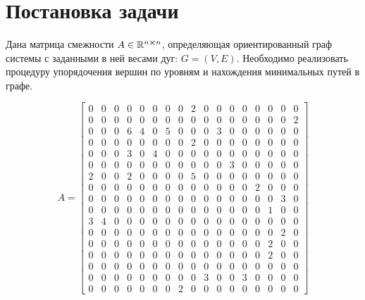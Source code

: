 


	
	
	\setcounter{page}{2}
	\tableofcontents
	\newpage
	

	\section{Постановка задачи}
	
	Дана матрица смежности $A\in\mathbb{R}^{n\cross n}$, определяющая ориентированный граф системы с заданными в ней весами дуг: $G = (V, E)$.	Необходимо реализовать процедуру упорядочения вершин по уровням и нахождения минимальных путей в графе.	
	
	
	\setcounter{MaxMatrixCols}{20}
	\begin{equation}
		A = 
		\begin{bmatrix}
			0 & 0 & 0 & 0 & 0 & 0 & 0 & 0 & 2 & 0 & 0 & 0 & 0 & 0 & 0 & 0 & 0 \\
			0 & 0 & 0 & 0 & 0 & 0 & 0 & 0 & 0 & 0 & 0 & 0 & 0 & 0 & 0 & 0 & 2 \\
			0 & 0 & 0 & 6 & 4 & 0 & 5 & 0 & 0 & 0 & 3 & 0 & 0 & 0 & 0 & 0 & 0 \\
			0 & 0 & 0 & 0 & 0 & 0 & 0 & 0 & 2 & 0 & 0 & 0 & 0 & 0 & 0 & 0 & 0 \\
			0 & 0 & 0 & 3 & 0 & 4 & 0 & 0 & 0 & 0 & 0 & 0 & 0 & 0 & 0 & 0 & 0 \\
			0 & 0 & 0 & 0 & 0 & 0 & 0 & 0 & 0 & 0 & 0 & 3 & 0 & 0 & 0 & 0 & 0 \\
			2 & 0 & 0 & 2 & 0 & 0 & 0 & 0 & 5 & 0 & 0 & 0 & 0 & 0 & 0 & 0 & 0 \\
			0 & 0 & 0 & 0 & 0 & 0 & 0 & 0 & 0 & 0 & 0 & 0 & 0 & 2 & 0 & 0 & 0 \\
			0 & 0 & 0 & 0 & 0 & 0 & 0 & 0 & 0 & 0 & 0 & 0 & 0 & 0 & 0 & 3 & 0 \\
			0 & 0 & 0 & 0 & 0 & 0 & 0 & 0 & 0 & 0 & 0 & 0 & 0 & 0 & 1 & 0 & 0 \\
			3 & 4 & 0 & 0 & 0 & 0 & 0 & 0 & 0 & 0 & 0 & 0 & 0 & 0 & 0 & 0 & 0 \\
			0 & 0 & 0 & 0 & 0 & 0 & 0 & 0 & 0 & 0 & 0 & 0 & 0 & 0 & 0 & 2 & 0 \\
			0 & 0 & 0 & 0 & 0 & 0 & 0 & 0 & 0 & 0 & 0 & 0 & 0 & 0 & 2 & 0 & 0 \\
			0 & 0 & 0 & 0 & 0 & 0 & 0 & 0 & 0 & 0 & 0 & 0 & 0 & 0 & 2 & 0 & 0 \\
			0 & 0 & 0 & 0 & 0 & 0 & 0 & 0 & 0 & 0 & 0 & 0 & 0 & 0 & 0 & 0 & 0 \\
			0 & 0 & 0 & 0 & 0 & 0 & 0 & 0 & 0 & 3 & 0 & 0 & 3 & 0 & 0 & 0 & 0 \\
			0 & 0 & 0 & 0 & 0 & 0 & 0 & 2 & 0 & 0 & 0 & 0 & 0 & 0 & 0 & 0 & 0
		\end{bmatrix}
	\end{equation}
	

